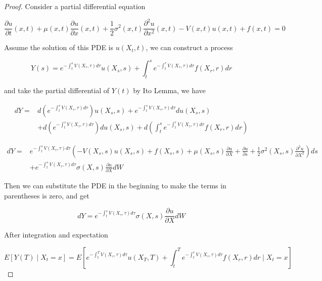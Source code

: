 \documentclass[a4]{article}
\begin{document}
\begin{proof}
Consider a partial differential equation\par 
$$
\frac{\partial u}{\partial t}(x, t)+\mu(x, t) \frac{\partial u}{\partial x}(x, t)+\frac{1}{2} \sigma^{2}(x, t) \frac{\partial^{2} u}{\partial x^{2}}(x, t)-V(x, t) u(x, t)+f(x, t)=0
$$\par 
\bigbreak 
\noindent Assume the solution of this PDE is $u(X_{t}, t)$, we can construct a process \par 
$$
Y(s)=e^{-\int_{t}^{s} V\left(X_{\tau}, \tau\right) d \tau} u\left(X_{s}, s\right)+\int_{t}^{s} e^{-\int_{t}^{r} V\left(X_{\tau}, \tau\right) d \tau} f\left(X_{r}, r\right) d r
$$\par 
\bigbreak 
\noindent and take the partial differential of $Y(t)$ by Ito Lemma, we have \par 
$$
\begin{aligned}
d Y=& d\left(e^{-\int_{t}^{s} V\left(X_{\tau}, \tau\right) d \tau}\right) u\left(X_{s}, s\right)+e^{-\int_{t}^{s} V\left(X_{\tau}, \tau\right) d \tau} d u\left(X_{s}, s\right) \\
&+d\left(e^{-\int_{t}^{s} V\left(X_{\tau}, \tau\right) d \tau}\right) d u\left(X_{s}, s\right)+d\left(\int_{t}^{s} e^{-\int_{t}^{r} V\left(X_{\tau}, \tau\right) d \tau} f\left(X_{r}, r\right) d r\right)
\end{aligned}
$$\par 
$$
\begin{aligned}
d Y=& e^{-\int_{t}^{s} V\left(X_{\tau}, \tau\right) d \tau}\left(-V\left(X_{s}, s\right) u\left(X_{s}, s\right)+f\left(X_{s}, s\right)+\mu\left(X_{s}, s\right) \frac{\partial u}{\partial X}+\frac{\partial u}{\partial s}+\frac{1}{2} \sigma^{2}\left(X_{s}, s\right) \frac{\partial^{2} u}{\partial X^{2}}\right) d s \\
&+e^{-\int_{t}^{s} V\left(X_{\tau}, \tau\right) d \tau} \sigma(X, s) \frac{\partial u}{\partial X} d W
\end{aligned}
$$\par 
\noindent Then we can substitute the PDE in the beginning to make the terms in parentheses is zero, and get \par 
$$
d Y=e^{-\int_{t}^{s} V\left(X_{\tau}, \tau\right) d \tau} \sigma(X, s) \frac{\partial u}{\partial X} d W
$$\par 
After integration and expectation\par 
$$
E\left[Y(T) \mid X_{t}=x\right]=E\left[e^{-\int_{t}^{T} V\left(X_{\tau}, \tau\right) d \tau} u\left(X_{T}, T\right)+\int_{t}^{T} e^{-\int_{t}^{r} V\left(X_{\tau}, \tau\right) d \tau} f\left(X_{r}, r\right) d r \mid X_{t}=x\right]
$$
\end{proof}
\end{document}
